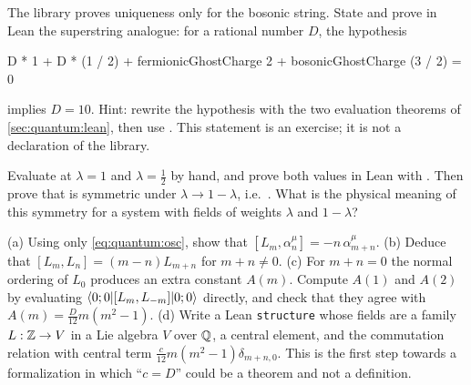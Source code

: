 \begin{exercise}[$\star\star$]\label{exo:quantum:superunique}
The library proves uniqueness only for the bosonic string. State and prove in Lean the
superstring analogue: for a rational number $D$, the hypothesis
\begin{leancode}
D * 1 + D * (1 / 2) + fermionicGhostCharge 2 + bosonicGhostCharge (3 / 2) = 0
\end{leancode}
implies $D=10$. Hint: rewrite the hypothesis with the two evaluation theorems of
\cref{sec:quantum:lean}, then use . This statement is an exercise; it is not
a declaration of the library.
\end{exercise}

\begin{exercise}[$\star\star$]
Evaluate  at $\lambda=1$ and $\lambda=\frac12$ by hand, and prove
both values in Lean with . Then prove that  is
symmetric under $\lambda\to1-\lambda$, i.e.\
. What is the physical
meaning of this symmetry for a system with fields of weights $\lambda$ and $1-\lambda$?
\end{exercise}

\begin{exercise}[$\star\star\star$]\label{exo:quantum:virasoro}
(a) Using only \cref{eq:quantum:osc}, show that $[L_m,\alpha^\mu_n]=-n\,\alpha^\mu_{m+n}$.
(b) Deduce that $[L_m,L_n]=(m-n)L_{m+n}$ for $m+n\neq0$. (c) For $m+n=0$ the normal ordering
of $L_0$ produces an extra constant $A(m)$. Compute $A(1)$ and $A(2)$ by evaluating
$\langle 0;0|[L_m,L_{-m}]|0;0\rangle$ directly, and check that they agree with
$A(m)=\frac{D}{12}m(m^2-1)$. (d) Write a Lean \texttt{structure} whose fields are a family
$L:\mathbb{Z}\to V$ in a Lie algebra $V$ over $\mathbb{Q}$, a central element, and the commutation relation
with central term $\frac{c}{12}m(m^2-1)\delta_{m+n,0}$. This is the first step towards a
formalization in which ``$c=D$'' could be a theorem and not a definition.
\end{exercise}


